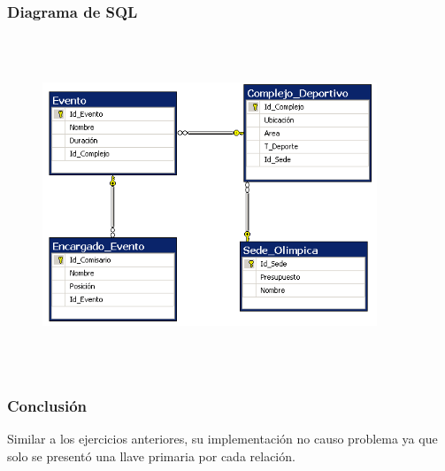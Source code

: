 \documentclass[a4paper, 12pt]{article}
\begin{document}
\begin{justify}
        \subsubsection{Diagrama de SQL}
        \begin{figure}[H]
            \centering
            \includegraphics[width=10cm,height=10cm]{sql8.PNG}
        \end{figure}
        \subsubsection{Conclusión}
        \justify
        Similar a los ejercicios anteriores, su implementación no causo problema ya que solo se presentó una llave primaria por cada relación.

\end{justify}
\end{document}
